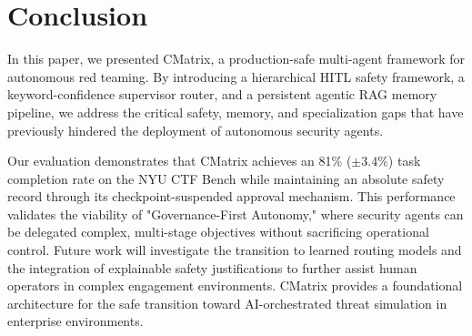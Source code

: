 \documentclass[conference,compsoc]{IEEEtran}
\begin{document}
\section{Conclusion}
In this paper, we presented CMatrix, a production-safe multi-agent framework for autonomous red teaming. By introducing a hierarchical HITL safety framework, a keyword-confidence supervisor router, and a persistent agentic RAG memory pipeline, we address the critical safety, memory, and specialization gaps that have previously hindered the deployment of autonomous security agents. 

Our evaluation demonstrates that CMatrix achieves an 81\% ($\pm 3.4\%$) task completion rate on the NYU CTF Bench while maintaining an absolute safety record through its checkpoint-suspended approval mechanism. This performance validates the viability of "Governance-First Autonomy," where security agents can be delegated complex, multi-stage objectives without sacrificing operational control. Future work will investigate the transition to learned routing models and the integration of explainable safety justifications to further assist human operators in complex engagement environments. CMatrix provides a foundational architecture for the safe transition toward AI-orchestrated threat simulation in enterprise environments.



\end{document}
